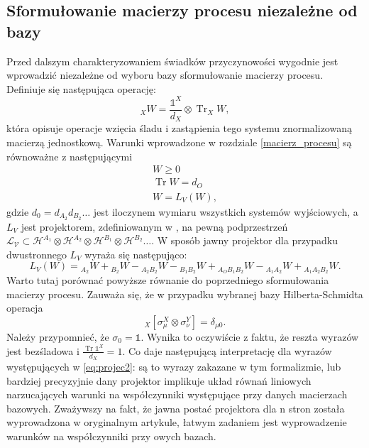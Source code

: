 \documentclass[10pt]{article} %
\DeclareMathOperator{\Trs}{Tr}
\newcommand{\Hx}[1]{\mathcal{H}^{#1}}
\newcommand{\I}{\mathbb{1}}
\begin{document}
\subsection{Sformułowanie macierzy procesu niezależne od bazy}
Przed dalszym charakteryzowaniem świadków przyczynowości wygodnie jest wprowadzić niezależne od wyboru bazy sformułowanie macierzy procesu.
Definiuje się następująca operację:
\begin{equation}
{}_X W = \frac{\I^X}{d_X} \otimes \Trs_X W,
\end{equation}
która opisuje operacje wzięcia śladu i zastąpienia tego systemu znormalizowaną macierzą jednostkową.
Warunki wprowadzone w rozdziale \ref{macierz_procesu} są równoważne z następującymi
\begin{gather}
W \geq 0 \\
\Trs W = d_O \\
W = L_V\left(W\right),
\end{gather}
gdzie $d_0 = d_{A_2} d_{B_2} \dots$ jest iloczynem wymiaru wszystkich systemów wyjściowych, a $L_V$ jest projektorem, zdefiniowanym w \cite{causal_witness}, na pewną podprzestrzeń 
$\mathcal{L_V} \subset \Hx{A_1} \otimes \Hx{A_2} \otimes \Hx{B_1} \otimes \Hx{B_2} \dots$.
W sposób jawny projektor dla przypadku dwustronnego $L_V$ wyraża się następująco:
\begin{equation}
\label{eq:projec2}
L_V(W) = {}_{A_2}W + {}_{B_2}W - {}_{A_2B_2}W - {}_{B_1B_2}W + {}_{A_OB_1B_2}W - {}_{A_1A_2}W + {}_{A_1A_2B_2}W.
\end{equation}
Warto tutaj porównać powyższe równanie do poprzedniego sformułowania macierzy procesu. Zauważa się, że w przypadku wybranej bazy Hilberta-Schmidta
operacja
\begin{equation}
{}_X\left[\sigma_\mu^X \otimes \sigma_\nu^Y\right] = \delta_{\mu0}.
\end{equation}
Należy przypomnieć, że $\sigma_0 = \I$.
Wynika to oczywiście z faktu, że reszta wyrazów jest bezśladowa i $\frac{\Trs \I^X}{d_X} = 1$. Co daje następującą interpretację dla wyrazów występujących w \eqref{eq:projec2}: są to wyrazy zakazane w tym formalizmie, lub bardziej precyzyjnie dany projektor implikuje układ równań liniowych narzucających warunki na współczynniki występujące przy danych macierzach bazowych. Zważywszy na fakt, że jawna postać projektora dla n stron została wyprowadzona w oryginalnym artykule, łatwym zadaniem jest wyprowadzenie warunków na współczynniki przy owych bazach. 
\end{document}

